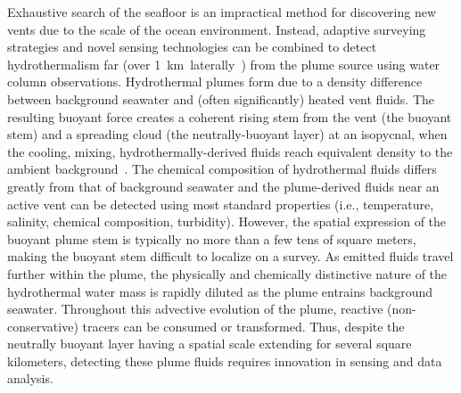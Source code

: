 Exhaustive search of the seafloor is an impractical method for discovering new vents due to the scale of the ocean environment. Instead, adaptive surveying strategies and novel sensing technologies can be combined to detect hydrothermalism far (over \SI{1}{\kilo\meter laterally)} from the plume source using water column observations. Hydrothermal plumes form due to a density difference between background seawater and (often significantly) heated vent fluids. The resulting buoyant force creates a coherent rising stem from the vent (the buoyant stem) and a spreading cloud (the neutrally-buoyant layer) at an isopycnal, when the cooling, mixing, hydrothermally-derived fluids reach equivalent density to the ambient background~\autocite{morton1956turbulent, speer1989model}. The chemical composition of hydrothermal fluids differs greatly from that of background seawater and the plume-derived fluids near an active vent can be detected using most standard properties (i.e., temperature, salinity, chemical composition, turbidity). However, the spatial expression of the buoyant plume stem is typically no more than a few tens of square meters, making the buoyant stem difficult to localize on a survey. As emitted fluids travel further within the plume, the physically and chemically distinctive nature of the hydrothermal water mass is rapidly diluted as the plume entrains background seawater. Throughout this advective evolution of the plume, reactive (non-conservative) tracers can be consumed or transformed. Thus, despite the neutrally buoyant layer having a spatial scale extending for several square kilometers, detecting these plume fluids requires innovation in sensing and data analysis.

